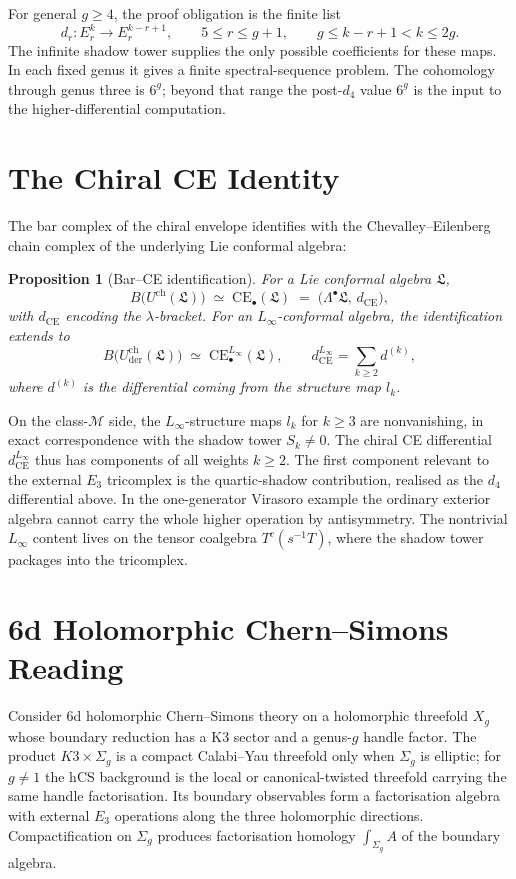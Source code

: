 \documentclass[11pt]{article}
\theoremstyle{plain}
\newtheorem{proposition}[theorem]{Proposition}
\theoremstyle{definition}
\theoremstyle{remark}
\newcommand{\fL}{\mathfrak{L}}
\newcommand{\CE}{\mathrm{CE}}
\newcommand{\Ucha}{U^{\mathrm{ch}}}
\begin{document}
For general $g\geq 4$, the proof obligation is the finite list
\[
 d_r \colon E_r^k\longrightarrow E_r^{k-r+1},
 \qquad 5\leq r\leq g+1,\qquad g\leq k-r+1<k\leq 2g.
\]
The infinite shadow tower supplies the only possible coefficients for these maps.
In each fixed genus it gives a finite spectral-sequence problem. The cohomology
through genus three is $6^g$; beyond that range the post-$d_4$ value
$6^g$ is the input to the higher-differential computation.

\section{The Chiral CE Identity}
\label{sec:chiral-ce}

The bar complex of the chiral envelope identifies with the
Chevalley--Eilenberg chain complex of the underlying Lie conformal
algebra:

\begin{proposition}[Bar--CE identification]
\label{prop:bar-ce}
For a Lie conformal algebra $\fL$,
\[
 B\bigl(\Ucha(\fL)\bigr) \;\simeq\; \CE_\bullet(\fL)
 \;=\;\bigl(\Lambda^\bullet\fL,\, d_{\CE}\bigr),
\]
with $d_{\CE}$ encoding the $\lambda$-bracket. For an $L_\infty$-conformal
algebra, the identification extends to
\[
 B\bigl(\Ucha_{\mathrm{der}}(\fL)\bigr) \;\simeq\; \CE^{L_\infty}_\bullet(\fL),
 \qquad d_{\CE}^{L_\infty} = \sum_{k\ge 2} d^{(k)},
\]
where $d^{(k)}$ is the differential coming from the structure map $l_k$.
\end{proposition}

On the class-$\mathcal{M}$ side, the $L_\infty$-structure maps $l_k$ for
$k\ge 3$ are nonvanishing, in exact correspondence with the shadow tower
$S_k\ne 0$. The chiral CE differential $d_{\CE}^{L_\infty}$ thus has
components of all weights $k\ge 2$. The first component relevant to the
external $E_3$ tricomplex is the quartic-shadow contribution, realised as
the $d_4$ differential above. In the one-generator Virasoro example the
ordinary exterior algebra cannot carry the whole higher operation by
antisymmetry. The nontrivial $L_\infty$ content lives on the tensor coalgebra
$T^c(s^{-1}T)$, where the shadow tower packages into the tricomplex.

\section{6d Holomorphic Chern--Simons Reading}
\label{sec:6d-hcs-interweave}

Consider 6d holomorphic Chern--Simons theory on a holomorphic threefold
$X_g$ whose boundary reduction has a K3 sector and a genus-$g$ handle
factor. The product $K3\times\Sigma_g$ is a compact Calabi--Yau threefold
only when $\Sigma_g$ is elliptic; for $g\ne 1$ the hCS background is the
local or canonical-twisted threefold carrying the same handle
factorisation. Its boundary observables form a factorisation
algebra with external $E_3$ operations along the three holomorphic
directions. Compactification on $\Sigma_g$ produces factorisation homology
$\int_{\Sigma_g}A$ of the boundary algebra.
\end{document}
